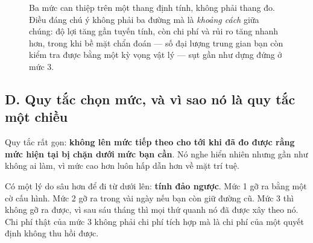 \documentclass[../../deep_learning.tex]{subfiles}
\begin{document}
\begin{figure}[H]\centering
{}
\caption{Ba mức can thiệp trên một thang định tính, không phải thang đo. Điều đáng chú ý không phải ba đường mà là \emph{khoảng cách} giữa chúng: độ lợi tăng gần tuyến tính, còn chi phí và rủi ro tăng nhanh hơn, trong khi bề mặt chẩn đoán --- số đại lượng trung gian bạn còn kiểm tra được bằng một kỳ vọng vật lý --- sụt gần như dựng đứng ở mức 3.}
\label{fig:f27-ba-muc}
\end{figure}

\subsection{D. Quy tắc chọn mức, và vì sao nó là quy tắc một chiều}
Quy tắc rất gọn: \textbf{không lên mức tiếp theo cho tới khi đã đo được rằng mức hiện tại bị chặn dưới mức bạn cần}. Nó nghe hiển nhiên nhưng gần như không ai làm, vì mức cao hơn luôn hấp dẫn hơn về mặt trí tuệ.

Có một lý do sâu hơn để đi từ dưới lên: \textbf{tính đảo ngược}. Mức 1 gỡ ra bằng một cờ cấu hình. Mức 2 gỡ ra trong vài ngày nếu bạn còn giữ đường cũ. Mức 3 thì không gỡ ra được, vì sau sáu tháng thì mọi thứ quanh nó đã được xây theo nó. Chi phí thật của mức 3 không phải chi phí tích hợp mà là chi phí của một quyết định không thu hồi được.
\end{document}

